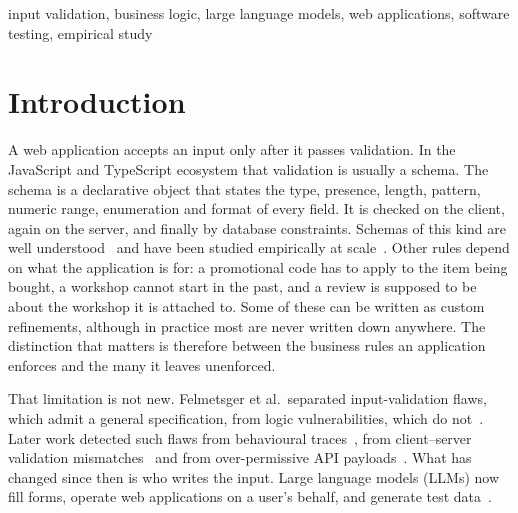 \documentclass[conference]{IEEEtran}
\begin{document}
\begin{IEEEkeywords}
input validation, business logic, large language models, web applications, software testing,
empirical study
\end{IEEEkeywords}

\section{Introduction}

A web application accepts an input only after it passes validation. In the JavaScript and TypeScript
ecosystem that validation is usually a schema. The schema is a declarative object that states the type,
presence, length, pattern, numeric range, enumeration and format of every field. It is checked on the
client, again on the server, and finally by database constraints. Schemas of this kind are well
understood~\cite{pezoa2016foundations,attouche2023jsonschema} and have been studied empirically at
scale~\cite{baazizi2021usagenot}. Other rules depend on what the application is for: a promotional code has to apply to the item being
bought, a workshop cannot start in the past, and a review is supposed to be about the workshop it is
attached to. Some of these can be written as custom refinements, although in practice most are never
written down anywhere. The distinction that matters is therefore between the business rules an
application enforces and the many it leaves unenforced.

That limitation is not new. Felmetsger et al.\ separated input-validation flaws, which admit a general
specification, from logic vulnerabilities, which do not~\cite{felmetsger2010waler}. Later work detected
such flaws from behavioural traces~\cite{pellegrino2014logicflaws}, from client--server validation
mismatches~\cite{bisht2010notamper} and from over-permissive API
payloads~\cite{corradini2023massassignment}. What has changed since then is who writes the input. Large
language models (LLMs) now fill forms, operate web applications on a user's behalf, and generate test
data~\cite{li2026webformtest,alian2024formnexus,li2025formfactory}.
\end{document}
